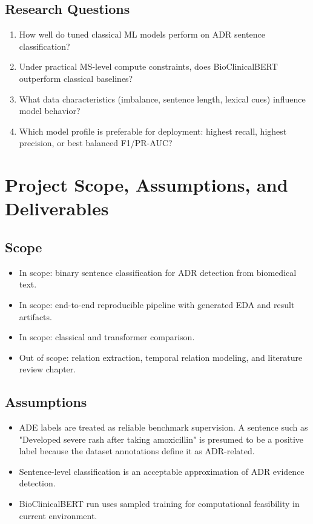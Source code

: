 \documentclass[11pt]{article}
\begin{document}
\subsection{Research Questions}

\begin{enumerate}
  \item How well do tuned classical ML models perform on ADR sentence classification?
  \item Under practical MS-level compute constraints, does BioClinicalBERT outperform classical baselines?
  \item What data characteristics (imbalance, sentence length, lexical cues) influence model behavior?
  \item Which model profile is preferable for deployment: highest recall, highest precision, or best balanced F1/PR-AUC?
\end{enumerate}

\section{Project Scope, Assumptions, and Deliverables}

\subsection{Scope}

\begin{itemize}
  \item In scope: binary sentence classification for ADR detection from biomedical text.
  \item In scope: end-to-end reproducible pipeline with generated EDA and result artifacts.
  \item In scope: classical and transformer comparison.
  \item Out of scope: relation extraction, temporal relation modeling, and literature review chapter.
\end{itemize}

\subsection{Assumptions}

\begin{itemize}
  \item ADE labels are treated as reliable benchmark supervision. A sentence such as "Developed severe rash after taking amoxicillin" is presumed to be a positive label because the dataset annotations define it as ADR-related.
  \item Sentence-level classification is an acceptable approximation of ADR evidence detection.
  \item BioClinicalBERT run uses sampled training for computational feasibility in current environment.
\end{itemize}
\end{document}
